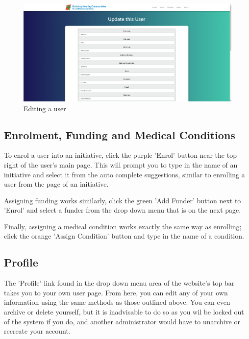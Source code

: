 \documentclass{bhcguides}
\begin{document}
\begin{figure}[h!]
 \centerline{\includegraphics[width=\textwidth, height=\textheight, keepaspectratio]{edituser.png}}
 \caption{Editing a user}
 \label{fig:editUser}
\end{figure}

\subsection{Enrolment, Funding and Medical Conditions}
\label{ssec:userenrolfundmed}

To enrol a user into an initiative, click the purple 'Enrol' button near the top right of the user's main page. This will prompt you to type in the name of an initiative and select it from the auto complete suggestions, similar to enrolling a user from the page of an initiative.

Assigning funding works similarly, click the green 'Add Funder' button next to 'Enrol' and select a funder from the drop down menu that is on the next page.

Finally, assigning a medical condition works exactly the same way as enrolling; click the orange 'Assign Condition' button and type in the name of a condition.

\subsection{Profile}
\label{ssec:profile}

The 'Profile' link found in the drop down menu area of the website's top bar takes you to your own user page. From here, you can edit any of your own information using the same methods as those outlined above. You can even archive or delete yourself, but it is inadvisable to do so as you wil be locked out of the system if you do, and another administrator would have to unarchive or recreate your account.
\end{document}

